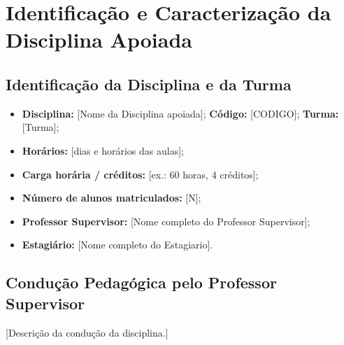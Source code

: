 \documentclass[12pt]{article}
\newcommand{\NomeDisciplina}{[Nome da Disciplina apoiada]}
\newcommand{\CodigoDisciplina}{[CODIGO]}
\newcommand{\Turma}{[Turma]}
\newcommand{\NomeProfessor}{[Nome completo do Professor Supervisor]}
\newcommand{\NomeEstagiario}{[Nome completo do Estagiario]}
\newif\ifmostrarinstrucoes
\newcommand{\instrucao}[1]{%
  \ifmostrarinstrucoes
  \begin{tcolorbox}[colback=instrbg, colframe=dccblue, arc=2mm, boxrule=0.6pt,
    title=\textbf{INSTRUÇÃO (apagar na versão final)}, fonttitle=\small]
  \small #1
  \end{tcolorbox}
  \fi}
\begin{document}

\begin{abstract}
\instrucao{Escreva um resumo de 1 parágrafo (150 a 250 palavras): disciplina e turma apoiada, papel do estagiário, principais atividades (elaboração/correção de trabalhos, atendimento a dúvidas, apoio em aulas e provas), principais resultados quantitativos e conclusão. Inclua 3 a 6 palavras-chave.}

\vspace{0.5cm}
\noindent \textbf{Palavras-chave:} [palavra 1], [palavra 2], [palavra 3].
\end{abstract}

\newpage
\tableofcontents
\newpage
{}

\section{Identificação e Caracterização da Disciplina Apoiada}\label{sec:disciplina}
\instrucao{Item 1 das Diretrizes: reproduza os dados da Proposta de Trabalho aprovada (identificação, condução da disciplina, ementa, bibliografia, avaliação e cronograma). O cronograma deve indicar o que foi planejado \emph{versus} o que foi efetivamente executado.}

\subsection{Identificação da Disciplina e da Turma}
\begin{itemize}[leftmargin=*]
    \item \textbf{Disciplina:} \NomeDisciplina; \textbf{Código:} \CodigoDisciplina; \textbf{Turma:} \Turma;
    \item \textbf{Horários:} [dias e horários das aulas];
    \item \textbf{Carga horária / créditos:} [ex.: 60 horas, 4 créditos];
    \item \textbf{Número de alunos matriculados:} [N];
    \item \textbf{Professor Supervisor:} \NomeProfessor;
    \item \textbf{Estagiário:} \NomeEstagiario.
\end{itemize}

\subsection{Condução Pedagógica pelo Professor Supervisor}
\instrucao{Descreva em 1 ou 2 parágrafos como o professor conduz a disciplina (aulas expositivas, laboratórios, trabalhos práticos, uso do Moodle etc.).}
[Descrição da condução da disciplina.]
\end{document}
